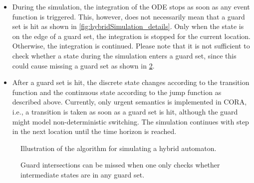 \begin{itemize}
 \item[\ding{194}] During the simulation, the integration of the ODE stops as soon as any event function is triggered. This, however, does not necessarily mean that a guard set is hit as shown in \cref{fig:hybridSimulation_details}. Only when the state is on the edge of a guard set, the integration is stopped for the current location. Otherwise, the integration is continued. Please note that it is not sufficient to check whether a state during the simulation enters a guard set, since this could cause missing a guard set as shown in \cref{fig:hybridSimulation_miss}.
 
 \item[\ding{195}] After a guard set is hit, the discrete state changes according to the transition function and the continuous state according to the jump function as described above. Currently, only urgent semantics is implemented in CORA, i.e., a transition is taken as soon as a guard set is hit, although the guard might model non-deterministic switching. The simulation continues with step  in the next location until the time horizon is reached.
\end{itemize}

\begin{figure}[htb]
  \centering	
	\vspace{0.5cm}
    \caption{Illustration of the algorithm for simulating a hybrid automaton.}
    \label{fig:hybridSimulation}		
\end{figure}

\begin{figure}[htb]
    \centering
    \caption{Guard intersections can be missed when one only checks whether intermediate states are in any guard set.}
    \label{fig:hybridSimulation_miss}		
\end{figure}
